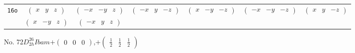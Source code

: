 \documentclass[fleqn,9pt,landscape]{jsarticle}
\begin{document}
\begin{center}
\begin{longtable}{ccccccc}
{\tt 16o} & $ \begin{pmatrix} x & y & z \end{pmatrix} $ & $ \begin{pmatrix} - x & - y & z \end{pmatrix} $ & $ \begin{pmatrix} - x & y & - z \end{pmatrix} $ & $ \begin{pmatrix} x & - y & - z \end{pmatrix} $ & $ \begin{pmatrix} - x & - y & - z \end{pmatrix} $ & $ \begin{pmatrix} x & y & - z \end{pmatrix} $ \\
& $ \begin{pmatrix} x & - y & z \end{pmatrix} $ & $ \begin{pmatrix} - x & y & z \end{pmatrix} $ & $  $ & $  $ & $  $ & $  $ \\
\end{longtable}
\end{center}
\newpage
No. 72\quad$D_{2h}^{26}$\quad$Ibam$\quad[ orthorhombic ]\quad$+\begin{pmatrix} 0 & 0 & 0 \end{pmatrix}$,\quad $+\begin{pmatrix} \frac{1}{2} & \frac{1}{2} & \frac{1}{2} \end{pmatrix}$
\end{document}
